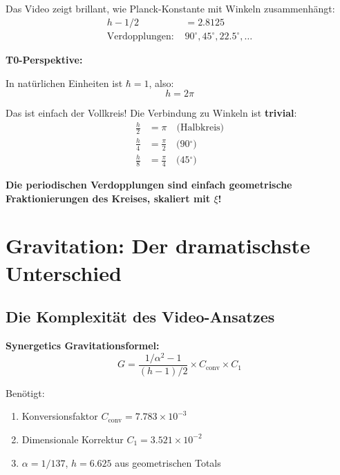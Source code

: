 \documentclass[12pt,a4paper]{article}
\newcommand{\xipar}{\xi}
\begin{document}
	Das Video zeigt brillant, wie Planck-Konstante mit Winkeln zusammenhängt:
	\begin{align}
		h - 1/2 &= 2.8125 \\
		\text{Verdopplungen: } &90^\circ, 45^\circ, 22.5^\circ, \ldots
	\end{align}
	
	\begin{vorteil}
		\textbf{T0-Perspektive:}
		
		In natürlichen Einheiten ist $\hbar = 1$, also:
		\begin{equation}
			h = 2\pi
		\end{equation}
		
		Das ist einfach der Vollkreis! Die Verbindung zu Winkeln ist \textbf{trivial}:
		\begin{align}
			\frac{h}{2} &= \pi \quad \text{(Halbkreis)} \\
			\frac{h}{4} &= \frac{\pi}{2} \quad \text{(90$^\circ$)} \\
			\frac{h}{8} &= \frac{\pi}{4} \quad \text{(45$^\circ$)}
		\end{align}
		
		\textbf{Die periodischen Verdopplungen sind einfach geometrische Fraktionierungen des Kreises, skaliert mit $\xipar$!}
	\end{vorteil}
	
	\section{Gravitation: Der dramatischste Unterschied}
	
	\subsection{Die Komplexität des Video-Ansatzes}
	
	\textbf{Synergetics Gravitationsformel:}
	\begin{equation}
		G = \frac{1/\alpha^2 - 1}{(h - 1)/2} \times C_{\text{conv}} \times C_1
	\end{equation}
	
	Benötigt:
	\begin{enumerate}
		\item Konversionsfaktor $C_{\text{conv}} = 7.783 \times 10^{-3}$
		\item Dimensionale Korrektur $C_1 = 3.521 \times 10^{-2}$
		\item $\alpha = 1/137$, $h=6.625$ aus geometrischen Totals
	\end{enumerate}
	
\end{document}
